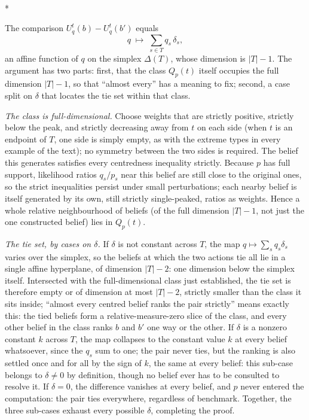 \documentclass[12pt]{article}
\makeatletter
\theoremstyle{definition}
\renewenvironment{proof}[1][\proofname]{\par
  \pushQED{\qed}%
  \normalfont \topsep6\p@\@plus6\p@\relax
  \trivlist
  \item[\hskip\labelsep\itshape #1\@addpunct{.}]\mbox{}\\*
  \ignorespaces
}{%
  \popQED\endtrivlist\@endpefalse
}
\makeatother
\begin{document}
\begin{proof}[Proof of Proposition \ref{th:sources}]
The comparison $U^t_q(b) - U^t_q(b')$ equals
\[
q \;\longmapsto\; \sum_{s \in T} q_s\, \delta_s ,
\]
an affine function of $q$ on the simplex $\Delta(T)$, whose dimension is $|T| - 1$. The argument has two parts: first, that the class $Q_p(t)$ itself occupies the full dimension $|T|-1$, so that ``almost every'' has a meaning to fix; second, a case split on $\delta$ that locates the tie set within that class.

\emph{The class is full-dimensional.} Choose weights that are strictly positive, strictly below the peak, and strictly decreasing away from $t$ on each side (when $t$ is an endpoint of $T$, one side is simply empty, as with the extreme types in every example of the text); no symmetry between the two sides is required. The belief this generates satisfies every centredness inequality strictly. Because $p$ has full support, likelihood ratios $q_s/p_s$ near this belief are still close to the original ones, so the strict inequalities persist under small perturbations; each nearby belief is itself generated by its own, still strictly single-peaked, ratios as weights. Hence a whole relative neighbourhood of beliefs (of the full dimension $|T|-1$, not just the one constructed belief) lies in $Q_p(t)$.

\emph{The tie set, by cases on $\delta$.} If $\delta$ is not constant across $T$, the map $q \mapsto \sum_s q_s \delta_s$ varies over the simplex, so the beliefs at which the two actions tie all lie in a single affine hyperplane, of dimension $|T| - 2$: one dimension below the simplex itself. Intersected with the full-dimensional class just established, the tie set is therefore empty or of dimension at most $|T| - 2$, strictly smaller than the class it sits inside; ``almost every centred belief ranks the pair strictly'' means exactly this: the tied beliefs form a relative-measure-zero slice of the class, and every other belief in the class ranks $b$ and $b'$ one way or the other. If $\delta$ is a nonzero constant $k$ across $T$, the map collapses to the constant value $k$ at every belief whatsoever, since the $q_s$ sum to one; the pair never ties, but the ranking is also settled once and for all by the sign of $k$, the same at every belief: this sub-case belongs to $\delta \neq 0$ by definition, though no belief ever has to be consulted to resolve it. If $\delta = 0$, the difference vanishes at every belief, and $p$ never entered the computation: the pair ties everywhere, regardless of benchmark. Together, the three sub-cases exhaust every possible $\delta$, completing the proof.
\end{proof}
\end{document}
